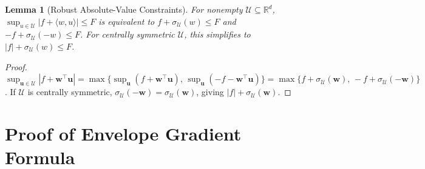 \documentclass[11pt]{article}
\newcommand{\R}{\mathbb{R}}
\newcommand{\cU}{\mathcal{U}}
\newcommand{\ip}[2]{\langle #1, #2 \rangle}
\newcommand{\bu}{\bm{u}}
\newcommand{\bw}{\bm{w}}
\newtheorem{lemma}[theorem]{Lemma}
\theoremstyle{definition}
\begin{document}
\begin{lemma}[Robust Absolute-Value Constraints]\label{lem:robust-abs}
For nonempty $\cU\subseteq\R^d$, $\sup_{u\in\cU}|f+\ip{w}{u}|\le F$ is equivalent to $f+\sigma_{\cU}(w)\le F$ and $-f+\sigma_{\cU}(-w)\le F$. For centrally symmetric $\cU$, this simplifies to $|f|+\sigma_{\cU}(w)\le F$.
\end{lemma}

\begin{proof}
$\sup_{\bu\in\cU}|f+\bw^\top\bu|=\max\{\sup_{\bu}(f+\bw^\top\bu),\,\sup_{\bu}(-f-\bw^\top\bu)\}=\max\{f+\sigma_\cU(\bw),\,-f+\sigma_\cU(-\bw)\}$. If $\cU$ is centrally symmetric, $\sigma_\cU(-\bw)=\sigma_\cU(\bw)$, giving $|f|+\sigma_\cU(\bw)$.
\end{proof}

\section{Proof of Envelope Gradient Formula}
\label{app:envelope-proof}
\end{document}
